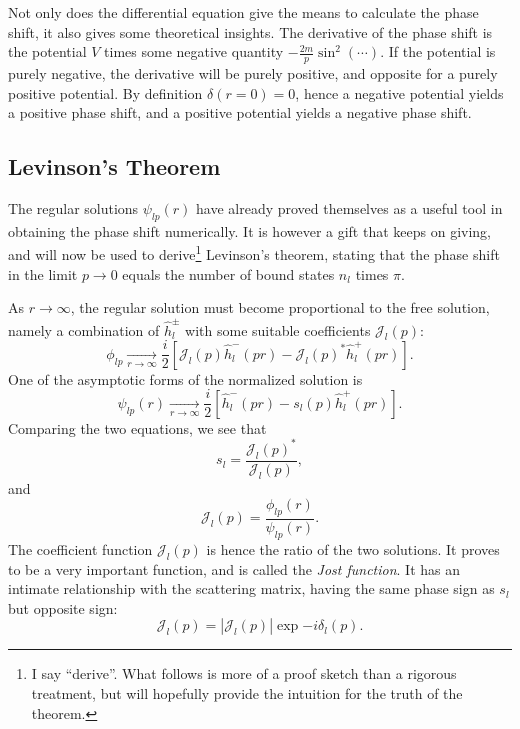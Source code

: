 Not only does the differential equation give the means to calculate the phase
shift, it also gives some theoretical insights. The derivative of the phase
shift is the potential \(V\) times some negative quantity
\(-\frac{2m}{p}\sin^{2}(\cdots)\). If the potential is purely negative, the
derivative will be purely positive, and opposite for a purely positive
potential. By definition \(\delta(r=0)=0\), hence a negative potential yields a
positive phase shift, and a positive potential yields a negative phase shift.

\subsection{Levinson's Theorem}

The regular solutions \(\psi_{lp}(r)\) have already proved themselves as a
useful tool in obtaining the phase shift numerically. It is however a gift that
keeps on giving, and will now be used to derive\footnote{I say ``derive''. What
  follows is more of a proof sketch than a rigorous treatment, but will
  hopefully provide the intuition for the truth of the theorem.} Levinson's
theorem, stating that the phase shift in the limit \(p\to 0\) equals the number
of bound states \(n_{l}\) times \(\pi\).



\newcommand{\js}{\mathscr{J}}
As \(r\to \infty\), the regular solution must become proportional to the free
solution, namely a combination of \(\hat{h}^{\pm}_{l}\) with some suitable
coefficients \(\js_{l}(p)\):
\begin{equation}
  \label{eq:jost}
  \phi_{lp}\xrightarrow[r\to\infty]{}\frac{i}{2}\left[ \js_{l}(p) \hat{h}^{-}_{l}(pr)-\js_{l}(p)^{*}\hat{h}^{+}_{l}(pr)    \right].
\end{equation}
One of the asymptotic forms of the normalized solution is
\begin{equation*}
  \psi_{lp}(r) \xrightarrow[r\to\infty]{}\frac{i}{2} \left[ \hat{h}_{l}^{-}(pr)- s_{l}(p)\hat{h}^{+}_{l}(pr)\right].
\end{equation*}
Comparing the two equations, we see that
\begin{equation*}
  s_{l} = \frac{\js_{l}(p)^{*}}{\js_{l}(p)},
\end{equation*}
and
\begin{equation*}
  \js_{l}(p) = \frac{\phi_{lp}(r)}{\psi_{lp}(r)}.
\end{equation*}
The coefficient function \(\js_{l}(p)\) is hence the ratio of the two
solutions. It proves to be a very important function, and is called the
\textit{Jost function}. It has an intimate relationship with the scattering
matrix, having the same phase sign as \(s_{l}\) but opposite sign:
\begin{equation*}
  \js_{l}(p) = |\js_{l}(p)|\exp{-i\delta_{l}(p)}.
\end{equation*}

